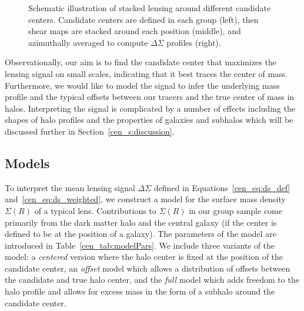 \begin{figure*}[htb]
\caption{Schematic illustration of stacked lensing around different
  candidate centers. Candidate centers are defined in each group
  (left), then shear maps are stacked around each position (middle), and
azimuthally averaged to compute $\Delta\Sigma$ profiles (right).}
\label{cen_fig:cartoon}
\end{figure*}

Observationally, our aim is to find the candidate center that
maximizes the lensing signal on small scales, indicating that it best
traces the center of mass. Furthermore, we would like to model the
signal to infer the underlying mass profile and the typical offsets
between our tracers and the true center of mass in halos. Interpreting
the signal is complicated by a number of effects including the shapes
of halo profiles and the properties of galaxies and subhalos which
will be discussed further in Section~\ref{cen_s:discussion}.


\subsection{Models}

To interpret the mean lensing signal $\Delta\Sigma$ defined in
Equations~\eqref{cen_eq:ds_def} and~\eqref{cen_eq:ds_weighted}, we construct a
model for the surface mass density $\Sigma(R)$ of a typical
lens. Contributions to $\Sigma(R)$ in our group sample come primarily from
the dark matter halo and the central galaxy (if the center is defined
to be at the position of a galaxy). The parameters of the model are introduced in
  Table~\ref{cen_tab:modelPars}. We include three variants of the model: a
\textit{centered} version where the halo center is fixed at the position of the
candidate center, an \textit{offset} model which allows a distribution
of offsets between the candidate and true halo center, and the
\textit{full} model which adds freedom to the halo profile and allows
for excess mass in the form of a subhalo around the candidate center.

